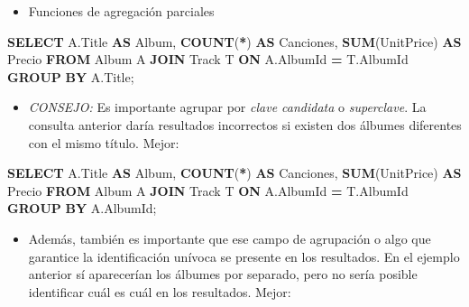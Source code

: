 \documentclass[
]{book}
\newenvironment{Shaded}{\begin{snugshade}}{\end{snugshade}}
\newcommand{\FunctionTok}[1]{\textcolor[rgb]{0.13,0.29,0.53}{\textbf{#1}}}
\newcommand{\KeywordTok}[1]{\textcolor[rgb]{0.13,0.29,0.53}{\textbf{#1}}}
\newcommand{\NormalTok}[1]{#1}
\newcommand{\OperatorTok}[1]{\textcolor[rgb]{0.81,0.36,0.00}{\textbf{#1}}}
\providecommand{\tightlist}{%
  \setlength{\itemsep}{0pt}\setlength{\parskip}{0pt}}
\theoremstyle{break}
\theoremstyle{nonumberplain}
\begin{document}
\begin{itemize}
\tightlist
\item
  Funciones de agregación parciales
\end{itemize}

\begin{Shaded}
\begin{Highlighting}[]
  \KeywordTok{SELECT}\NormalTok{ A.Title }\KeywordTok{AS}\NormalTok{ Album, }\FunctionTok{COUNT}\NormalTok{(}\OperatorTok{*}\NormalTok{) }\KeywordTok{AS}\NormalTok{ Canciones, }\FunctionTok{SUM}\NormalTok{(UnitPrice) }\KeywordTok{AS}\NormalTok{ Precio }
  \KeywordTok{FROM}\NormalTok{ Album A }\KeywordTok{JOIN}\NormalTok{ Track T }\KeywordTok{ON}\NormalTok{ A.AlbumId }\OperatorTok{=}\NormalTok{ T.AlbumId }
  \KeywordTok{GROUP} \KeywordTok{BY}\NormalTok{ A.Title; }
\end{Highlighting}
\end{Shaded}

\begin{itemize}
\tightlist
\item
  \emph{CONSEJO:} Es importante agrupar por \emph{clave candidata} o \emph{superclave}.
  La consulta anterior daría resultados incorrectos si existen dos álbumes diferentes con el mismo título.
  Mejor:
\end{itemize}

\begin{Shaded}
\begin{Highlighting}[]
  \KeywordTok{SELECT}\NormalTok{ A.Title }\KeywordTok{AS}\NormalTok{ Album, }\FunctionTok{COUNT}\NormalTok{(}\OperatorTok{*}\NormalTok{) }\KeywordTok{AS}\NormalTok{ Canciones, }\FunctionTok{SUM}\NormalTok{(UnitPrice) }\KeywordTok{AS}\NormalTok{ Precio }
  \KeywordTok{FROM}\NormalTok{ Album A }\KeywordTok{JOIN}\NormalTok{ Track T }\KeywordTok{ON}\NormalTok{ A.AlbumId }\OperatorTok{=}\NormalTok{ T.AlbumId }
  \KeywordTok{GROUP} \KeywordTok{BY}\NormalTok{ A.AlbumId;}
\end{Highlighting}
\end{Shaded}

\begin{itemize}
\tightlist
\item
  Además, también es importante que ese campo de agrupación o algo que garantice la identificación unívoca
  se presente en los resultados. En el ejemplo anterior sí aparecerían los álbumes por separado, pero no
  sería posible identificar cuál es cuál en los resultados. Mejor:
\end{itemize}
\end{document}
